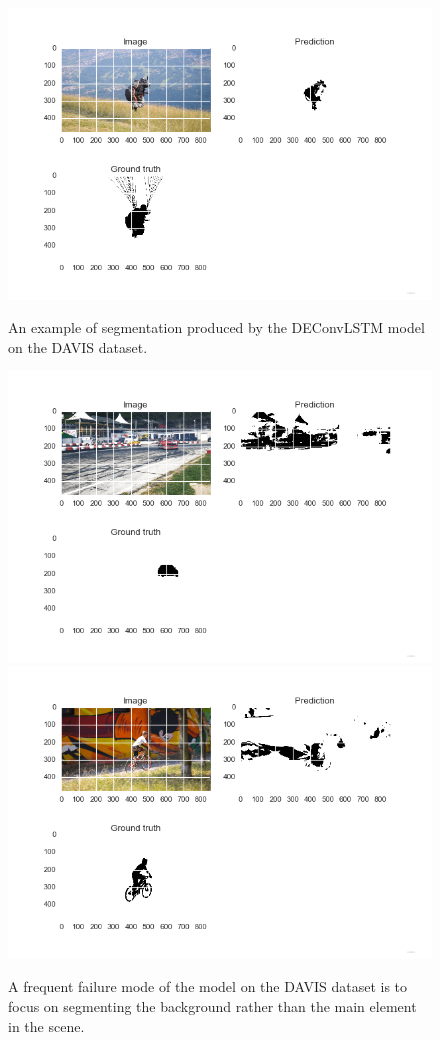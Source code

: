 \begin{figure}[t]
    \centering
    \includegraphics[trim={0 15mm 0 0},width=0.8\columnwidth]{img/deconvLSTM/paragliding-0.png}\\
    \caption{An example of segmentation produced by the DEConvLSTM model on
        the DAVIS dataset.}
    \label{fig:deconvlstm_gatech_sample}
\end{figure}

\begin{figure}[t]
    \centering
    \includegraphics[trim={0 15mm 0 0},width=0.8\columnwidth]{img/deconvLSTM/drift-0.png}\\
    \includegraphics[trim={0 15mm 0 0},width=0.8\columnwidth]{img/deconvLSTM/bmx-trees-0.png}
    \caption{A frequent failure mode of the model on the DAVIS dataset is to
        focus on segmenting the background rather than the main element in the
        scene.}
    \label{fig:deconvlstm_gatech_failure}
\end{figure}



